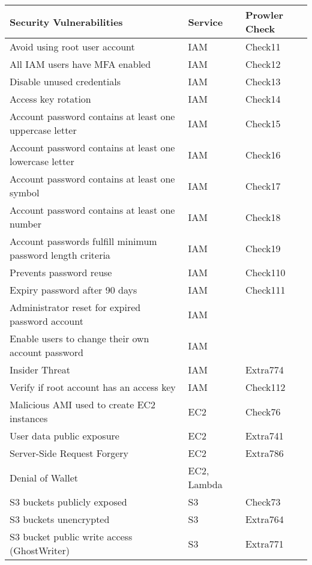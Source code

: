 \begin{longtable}{|p{10cm}|p{2.4cm}|p{2cm}|}
    \hline
    \textbf{Security Vulnerabilities} & \textbf{Service} & \textbf{Prowler Check}\\
    \hline
    Avoid using root user account & IAM & Check11 \\
    \hline
    All IAM users have MFA enabled & IAM & Check12 \\
    \hline
    Disable unused credentials & IAM & Check13 \\
    \hline
    Access key rotation & IAM & Check14 \\
    \hline
    Account password contains at least one uppercase letter & IAM & Check15 \\
    \hline
    Account password contains at least one lowercase letter & IAM & Check16 \\
    \hline
    Account password contains at least one symbol & IAM & Check17\\
    \hline
    Account password contains at least one number & IAM & Check18\\
    \hline
    Account passwords fulfill minimum password length
    criteria & IAM & Check19\\
    \hline
    Prevents password reuse & IAM & Check110\\
    \hline
    Expiry password after 90 days & IAM & Check111\\
    \hline
    Administrator reset for expired password account & IAM & \\
    \hline
    Enable users to change their own account password & IAM& \\
    \hline
    Insider Threat & IAM & Extra774\\
    \hline
    Verify if root account has an access key & IAM &
    Check112 \\
    \hline
    Malicious AMI used to create EC2 instances & EC2 & Check76\\
    \hline
    User data public exposure & EC2 & Extra741\\
    \hline
    Server-Side Request Forgery & EC2 & Extra786\\
    \hline
    Denial of Wallet & EC2, Lambda &\\
    \hline
    S3 buckets publicly exposed & S3 & Check73\\
    \hline
    S3 buckets unencrypted & S3 & Extra764\\
    \hline
    S3 bucket public write access (GhostWriter) & S3 & Extra771 \\

\end{longtable}

